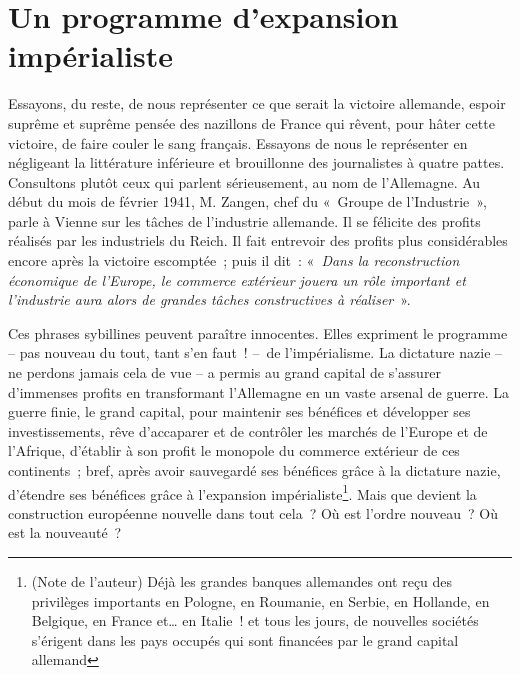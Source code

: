 \documentclass[french,twoside]{book} %
\begin{document}
\section[{Un programme d’expansion impérialiste}]{Un programme d’expansion impérialiste}
\noindent Essayons, du reste, de nous représenter ce que serait la victoire allemande, espoir suprême et suprême pensée des nazillons de France qui rêvent, pour hâter cette victoire, de faire couler le sang français. Essayons de nous le représenter en négligeant la littérature inférieure et brouillonne des journalistes à quatre pattes. Consultons plutôt ceux qui parlent sérieusement, au nom de l’Allemagne. Au début du mois de février 1941, M. Zangen, chef du « Groupe de l’Industrie », parle à Vienne sur les tâches de l’industrie allemande. Il se félicite des profits réalisés par les industriels du Reich. Il fait entrevoir des profits plus considérables encore après la victoire escomptée ; puis il dit : « \emph{Dans la reconstruction économique de l’Europe, le commerce extérieur jouera un rôle important et l’industrie aura alors de grandes tâches constructives à réaliser} ».\par
Ces phrases sybillines peuvent paraître innocentes. Elles expriment le programme – pas nouveau du tout, tant s’en faut ! – de l’impérialisme. La dictature nazie – ne perdons jamais cela de vue – a permis au grand capital de s’assurer d’immenses profits en transformant l’Allemagne en un vaste arsenal de guerre. La guerre finie, le grand capital, pour maintenir ses bénéfices et développer ses investissements, rêve d’accaparer et de contrôler les marchés de l’Europe et de l’Afrique, d’établir à son profit le monopole du commerce extérieur de ces continents ; bref, après avoir sauvegardé ses bénéfices grâce à la dictature nazie, d’étendre ses bénéfices grâce à l’expansion impérialiste\footnote{(Note de l’auteur) Déjà les grandes banques allemandes ont reçu des privilèges importants en Pologne, en Roumanie, en Serbie, en Hollande, en Belgique, en France et… en Italie ! et tous les jours, de nouvelles sociétés s’érigent dans les pays occupés qui sont financées par le grand capital allemand}. Mais que devient la construction européenne nouvelle dans tout cela ? Où est l’ordre nouveau ? Où est la nouveauté ?\par
\end{document}
